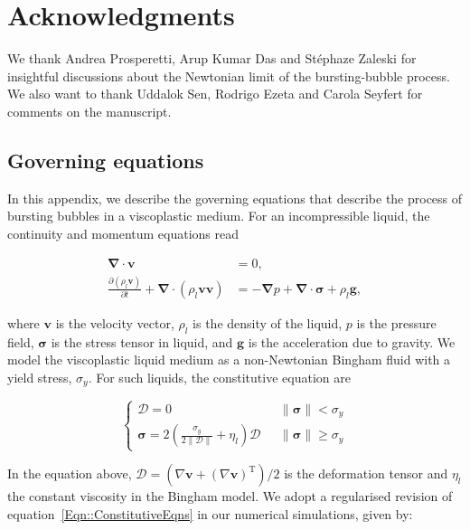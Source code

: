 \section*{Acknowledgments}
We thank Andrea Prosperetti, Arup Kumar Das and St{\'e}phaze Zaleski for insightful discussions about the Newtonian limit of the bursting-bubble process. We also want to thank Uddalok Sen, Rodrigo Ezeta and Carola Seyfert for comments on the manuscript.

\begin{subappendices}
	
\section{Governing equations}\label{App::GoverningEquations}

In this appendix, we describe the governing equations that describe the process of bursting bubbles in a viscoplastic medium. For an incompressible liquid, the continuity and momentum equations read  

\begin{align}\label{Eqn::NS_liq}
	\boldsymbol{\nabla\cdot v} & = 0,\\ 
	\label{Eqn::NS_liq2}
	\frac{\partial \left(\rho_l\boldsymbol{v}\right)}{\partial t} + \boldsymbol{\nabla\cdot}\left(\rho_l\boldsymbol{vv}\right) &= -\boldsymbol{\nabla} p + \boldsymbol{\nabla\cdot\sigma} + \rho_l\boldsymbol{g},
\end{align}

\noindent where $\boldsymbol{v}$ is the velocity vector, $\rho_l$ is the density of the liquid, $p$ is the pressure field, $\boldsymbol{\sigma}$ is the stress tensor in liquid, and $\boldsymbol{g}$ is the acceleration due to gravity.
We model the viscoplastic liquid medium as a non-Newtonian Bingham fluid with a yield stress, $\sigma_y$. For such liquids, the constitutive equation are

\begin{equation}\label{Eqn::ConstitutiveEqns}
	\begin{cases}
		\boldsymbol{\mathcal{D}} = 0\,\,&\,\,\|\boldsymbol{\sigma}\| < \sigma_y\\
		\boldsymbol{\sigma} =2\left( \frac{\sigma_y}{2 \|\boldsymbol{\mathcal{D}} \|} + \eta_l \right)\boldsymbol{\mathcal{D}}\,\,&\,\,\|\boldsymbol{\sigma}\| \geq \sigma_y
	\end{cases}
\end{equation} 

In the equation above, $\boldsymbol{\mathcal{D}} = \left(\nabla\boldsymbol{v} + \left(\nabla\boldsymbol{v}\right)^{\text{T}}\right)/2$ is the deformation tensor and $\eta_l$ the constant viscosity in the Bingham model. 
We adopt a regularised revision of equation~\eqref{Eqn::ConstitutiveEqns} in our numerical simulations, given by:


\end{subappendices}
